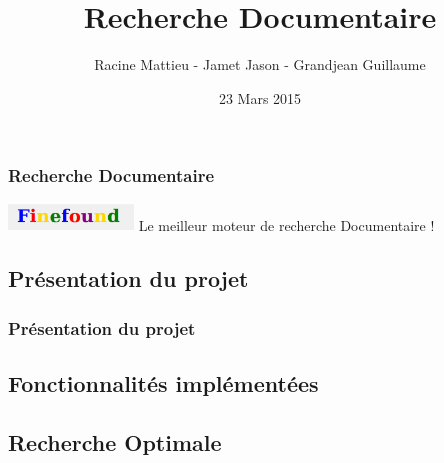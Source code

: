 \documentclass{beamer}
\title{Recherche Documentaire}
\author{Racine Mattieu - Jamet Jason - Grandjean Guillaume}
\institute{Faculté des Sciences}
\date{23 Mars 2015}
\begin{document}
    \begin{frame}
     \titlepage
    \end{frame}


    \begin{frame}[allowframebreaks] %
      \frametitle{Recherche Documentaire}
      \begin{center}
      \includegraphics[width=0.25\textwidth]{finefound.eps}
      Le meilleur moteur de recherche Documentaire !    
      \end{center}
    \end{frame}
    
    
    \begin{frame}  
     \tableofcontents
    \end{frame}

    \begin{frame}
     \section{Présentation du projet}
     \frametitle{Présentation du projet}
    \end{frame}
    
    \begin{frame}
     \section{Fonctionnalités implémentées}
    \end{frame}
    
    \begin{frame}
     \section{Recherche Optimale}
    \end{frame}

    
    
    
    
\end{document}
